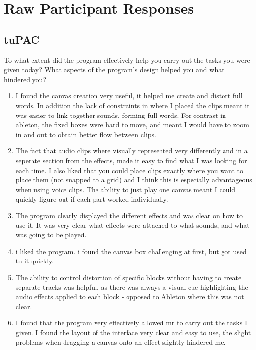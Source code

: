 \documentclass[12pt,a4paper,oneside,openright]{report}
\begin{document}
\printbibliography

\appendix


\chapter{Raw Participant Responses}\label{appendix:raw}

\section{tuPAC}
To what extent did the program effectively help you carry out the tasks you were given today? What aspects of the program's design helped you and what hindered you? 
\begin{enumerate}
    \item I found the canvas creation very useful, it helped me create and distort full words. In addition the lack of constraints in where I placed the clips meant it was easier to link together sounds, forming full words. For contrast in ableton, the fixed boxes were hard to move, and meant I would have to zoom in and out to obtain better flow between clips.
    \item The fact that audio clips where visually represented very differently and in a seperate section from the effects, made it easy to find what I was looking for each time. I also liked that you could place clips exactly where you want to place them (not snapped to a grid) and I think this is especially advantageous when using voice clips. The ability to just play one canvas meant I could quickly figure out if each part worked individually.
    \item The program clearly displayed the different effects and was clear on how to use it. It was very clear what effects were attached to what sounds, and what was going to be played.
    \item i liked the program. i found the canvas box challenging at first, but got used to it quickly.
    \item The ability to control distortion of specific blocks without having to create separate tracks was helpful, as there was always a visual cue highlighting the audio effects applied to each block - opposed to Ableton where this was not clear.
    \item I found that the program very effectively allowed mr to carry out the tasks I given. I found the layout of the interface very clear and easy to use, the slight problems when dragging a canvas onto an effect slightly hindered me.
\end{enumerate}
\end{document}
